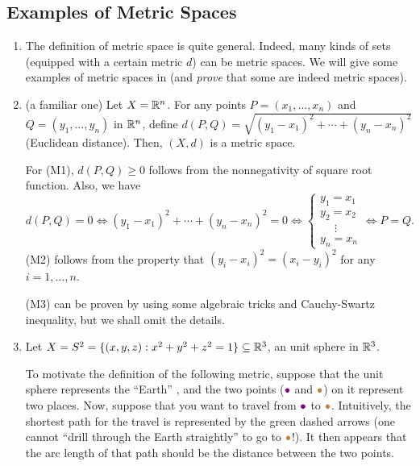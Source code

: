 \subsection{Examples of Metric Spaces}
\label{subsect:metric-sp-eg}
\begin{enumerate}
\item The definition of metric space is quite general. Indeed, many kinds of
sets (equipped with a certain metric \(d\)) can be metric spaces. We will give
some examples of metric spaces in  (and \emph{prove}
that some are indeed metric spaces).

\item (a familiar one) Let \(X=\mathbb{R}^n\). For any points \(P=(x_1,\dotsc,x_n)\)
and \(Q=(y_1,\dotsc,y_n)\) in \(\mathbb{R}^n\), define
\(d(P,Q)=\sqrt{(y_1-x_1)^{2}+\dotsb+(y_n-x_n)^{2}}\) (Euclidean distance).
Then, \((X,d)\) is a metric space.

\begin{pf}
For (M1), \(d(P,Q)\ge 0\) follows from the nonnegativity of square root
function. Also, we have
\[
d(P,Q)=0\iff (y_1-x_1)^{2}+\dotsb+(y_n-x_n)^{2}=0
\iff \begin{cases}
y_1=x_1\\
y_2=x_2\\
\quad\;\vdots\\
y_n=x_n
\end{cases}
\iff
P=Q.
\]
(M2) follows from the property that \((y_i-x_i)^{2}=(x_i-y_i)^{2}\) for any
\(i=1,\dotsc,n\).

(M3) can be proven by using some algebraic tricks and Cauchy-Swartz inequality,
but we shall omit the details.
\end{pf}
\item Let \(X=S^2=\{(x,y,z):x^2+y^2+z^2=1\}\subseteq\mathbb{R}^3\), an unit sphere in
\(\mathbb{R}^3\).
\begin{center}
\end{center}
To motivate the definition of the following metric, suppose that the unit
sphere represents the ``Earth'' , and the two points
(\({\color{violet}\bullet}\) and \({\color{brown}\bullet}\)) on it represent
two places. Now, suppose that you want to travel  from
\({\color{violet}\bullet}\) to \({\color{brown}\bullet}\). Intuitively, the
shortest path for the travel is represented by the {\color{green!50!black}green
dashed arrows} (one cannot ``drill through the Earth straightly'' to go to
\({\color{brown}\bullet}\)!). It then appears that the arc length of that path
should be the distance between the two points.


\end{enumerate}
